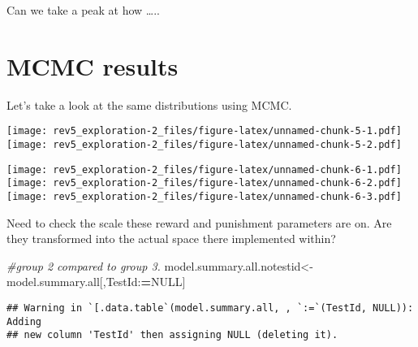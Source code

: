 \documentclass[]{article}
\newenvironment{Shaded}{\begin{snugshade}}{\end{snugshade}}
\newcommand{\CommentTok}[1]{\textcolor[rgb]{0.56,0.35,0.01}{\textit{{#1}}}}
\newcommand{\OtherTok}[1]{\textcolor[rgb]{0.56,0.35,0.01}{{#1}}}
\newcommand{\ErrorTok}[1]{\textcolor[rgb]{0.64,0.00,0.00}{\textbf{{#1}}}}
\newcommand{\NormalTok}[1]{{#1}}
\begin{document}
Can we take a peak at how \ldots{}..

\section{MCMC results}\label{mcmc-results}

Let's take a look at the same distributions using MCMC.

\texttt{[image: rev5\_exploration-2\_files/figure-latex/unnamed-chunk-5-1.pdf]}
\texttt{[image: rev5\_exploration-2\_files/figure-latex/unnamed-chunk-5-2.pdf]}

\texttt{[image: rev5\_exploration-2\_files/figure-latex/unnamed-chunk-6-1.pdf]}
\texttt{[image: rev5\_exploration-2\_files/figure-latex/unnamed-chunk-6-2.pdf]}
\texttt{[image: rev5\_exploration-2\_files/figure-latex/unnamed-chunk-6-3.pdf]}

Need to check the scale these reward and punishment parameters are on.
Are they transformed into the actual space there implemented within?

\begin{Shaded}
\begin{Highlighting}[]
\CommentTok{#group 2 compared to group 3.}
\NormalTok{model.summary.all.notestid<-model.summary.all[,TestId:}\ErrorTok{=}\OtherTok{NULL}\NormalTok{] }
\end{Highlighting}
\end{Shaded}

\begin{verbatim}
## Warning in `[.data.table`(model.summary.all, , `:=`(TestId, NULL)): Adding
## new column 'TestId' then assigning NULL (deleting it).
\end{verbatim}
\end{document}
